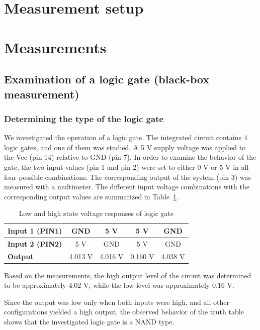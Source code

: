 \documentclass[12pt]{article}
\begin{document}
\newpage \section{Measurement setup}

\pagebreak\section{Measurements}

\subsection{Examination of a logic gate (black-box measurement)}

\subsubsection{Determining the type of the logic gate}
We investigated the operation of a logic gate. The integrated circuit contains 4 logic gates, and one of them was studied. A 5 V supply voltage was applied to the Vcc (pin 14) relative to GND (pin 7).
In order to examine the behavior of the gate, the two input values (pin 1 and pin 2) were set to either 0 V or 5 V in all four possible combinations. The corresponding output of the system (pin 3) was measured with a multimeter. The different input voltage combinations with the corresponding output values are summarized in Table~\ref{tab:logicgate1}.
\begin{table}[ht]
    \centering
    \begin{tabular}{l|c|c|c|c}
    \hline
    \textbf{Input 1 (PIN1)} & GND & 5 V & 5 V & GND \\ \hline
    \textbf{Input 2 (PIN2)} & 5 V  & GND & 5 V & GND \\ \hline
    \textbf{Output} & 4.013 V & 4.016 V & 0.160 V & 4.038 V \\ \hline
    \end{tabular}
    \caption{Low and high state voltage responses of logic gate}
    \label{tab:logicgate1}
\end{table}

Based on the measurements, the high output level of the circuit was determined to be approximately 4.02 V, while the low level was approximately 0.16 V.

Since the output was low only when both inputs were high, and all other configurations yielded a high output, the observed behavior of the truth table shows that the investigated logic gate is a NAND type. 
\end{document}
